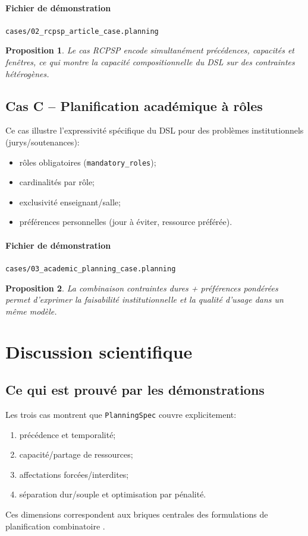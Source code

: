 \documentclass[12pt,a4paper]{article}
\newtheorem{proposition}{Proposition}
\begin{document}
\paragraph{Fichier de démonstration}
\texttt{cases/02\_rcpsp\_article\_case.planning}



\begin{proposition}
Le cas RCPSP encode simultanément précédences, capacités et fenêtres, ce qui montre la capacité compositionnelle du DSL sur des contraintes hétérogènes.
\end{proposition}

\subsection{Cas C -- Planification académique à rôles}
Ce cas illustre l'expressivité spécifique du DSL pour des problèmes institutionnels (jurys/soutenances):
\begin{itemize}
  \item rôles obligatoires (\texttt{mandatory\_roles});
  \item cardinalités par rôle;
  \item exclusivité enseignant/salle;
  \item préférences personnelles (jour à éviter, ressource préférée).
\end{itemize}

\paragraph{Fichier de démonstration}
\texttt{cases/03\_academic\_planning\_case.planning}



\begin{proposition}
La combinaison contraintes dures + préférences pondérées permet d'exprimer la faisabilité institutionnelle et la qualité d'usage dans un même modèle.
\end{proposition}

\section{Discussion scientifique}
\subsection{Ce qui est prouvé par les démonstrations}
Les trois cas montrent que \texttt{PlanningSpec} couvre explicitement:
\begin{enumerate}
  \item précédence et temporalité;
  \item capacité/partage de ressources;
  \item affectations forcées/interdites;
  \item séparation dur/souple et optimisation par pénalité.
\end{enumerate}
Ces dimensions correspondent aux briques centrales des formulations de planification combinatoire \cite{abdolrazzagh2017jssp,marriott1998cp}.
\end{document}
